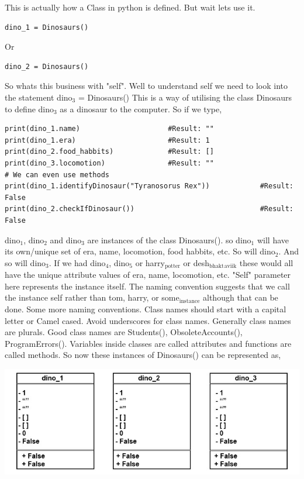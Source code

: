\documentclass[11pt]{article}
\begin{document}
This is actually how a Class in python is defined. But wait lets use it.

\begin{verbatim}
dino_1 = Dinosaurs()
\end{verbatim}

Or

\begin{verbatim}
dino_2 = Dinosaurs()
\end{verbatim}

So whats this business with "self". Well to understand self we need to look into the statement
dino\(_{\text{3}}\) = Dinosaurs()
This is a way of utilising the class Dinosaurs to define dino\(_{\text{3}}\) as a dinosaur to the computer. So if we type,
\begin{verbatim}
print(dino_1.name)                     #Result: ""
print(dino_1.era)                      #Result: 1
print(dino_2.food_habbits)             #Result: []
print(dino_3.locomotion)               #Result: ""
# We can even use methods
print(dino_1.identifyDinosaur("Tyranosorus Rex"))            #Result: False
print(dino_2.checkIfDinosaur())                              #Result: False
\end{verbatim}


dino\(_{\text{1}}\), dino\(_{\text{2}}\) and dino\(_{\text{3}}\) are instances of the class Dinosaurs().
so dino\(_{\text{1}}\) will have its own/unique set of era, name, locomotion, food habbits, etc. So will dino\(_{\text{2}}\). And so will dino\(_{\text{3}}\). If we had dino\(_{\text{4}}\), dino\(_{\text{5}}\) or harry\(_{\text{potter}}\) or desh\(_{\text{bhakt}}\)\(_{\text{aviik}}\) these would all have the unique attribute values of
era, name, locomotion, etc. "Self" parameter here represents the instance itself. The naming convention suggests that we call the instance self rather than tom, harry, or some\(_{\text{instance}}\) although that can be done. Some more naming conventions. Class names should start with a capital letter or Camel cased. Avoid underscores for class names. Generally class names are plurals. Good class names are Students(), ObsoleteAccounts(), ProgramErrors(). Variables inside classes are called attributes and functions are called methods. So now these instances of Dinosaurs() can be represented as,

\begin{center}
\includegraphics[width=.9\linewidth]{./img/dino_uml_empty.jpg}
\end{center}
\end{document}
